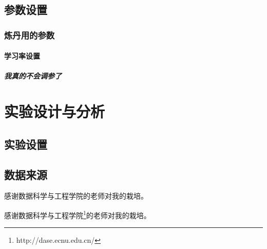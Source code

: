 \documentclass{ecnuthesis}
\begin{document}
\section{参数设置}

\subsection{炼丹用的参数}

\subsubsection{学习率设置}

\paragraph{我真的不会调参了}

\chapter{实验设计与分析}

\section{实验设置}

\section{数据来源}

\backmatter
\printbibliography

\nocite{zhang2021dive}
\nocite{Goodfellow-et-al-2016}
\nocite{qiu2020nndl}

\begin{appendix}
 感谢数据科学与工程学院的老师对我的栽培。
\end{appendix}

\begin{acknowledgement}

感谢数据科学与工程学院\footnote{http://dase.ecnu.edu.cn/}的老师对我的栽培。
\end{acknowledgement}
\end{document}
